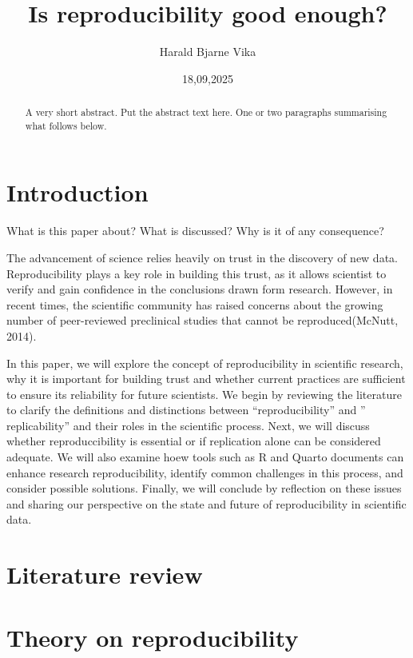 \documentclass[
  british,
  a4paper,
]{article}
\title{Is reproducibility good enough?}
\author{Harald Bjarne Vika}
\date{18,09,2025}
\begin{document}
\maketitle
\begin{abstract}
A very short abstract. Put the abstract text here. One or two paragraphs
summarising what follows below.
\end{abstract}


\section{Introduction}\label{introduction}

What is this paper about? What is discussed? Why is it of any
consequence?

The advancement of science relies heavily on trust in the discovery of
new data. Reproducibility plays a key role in building this trust, as it
allows scientist to verify and gain confidence in the conclusions drawn
form research. However, in recent times, the scientific community has
raised concerns about the growing number of peer-reviewed preclinical
studies that cannot be reproduced(McNutt, 2014).

In this paper, we will explore the concept of reproducibility in
scientific research, why it is important for building trust and whether
current practices are sufficient to ensure its reliability for future
scientists. We begin by reviewing the literature to clarify the
definitions and distinctions between ``reproducibility'' and ''
replicability'' and their roles in the scientific process. Next, we will
discuss whether reproduccibility is essential or if replication alone
can be considered adequate. We will also examine hoew tools such as R
and Quarto documents can enhance research reproducibility, identify
common challenges in this process, and consider possible solutions.
Finally, we will conclude by reflection on these issues and sharing our
perspective on the state and future of reproducibility in scientific
data.

\section{Literature review}\label{literature-review}

\section{Theory on reproducibility}\label{theory-on-reproducibility}
\end{document}
